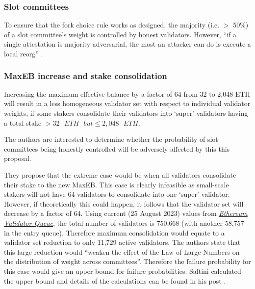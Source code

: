 \documentclass[UTF8]{article}
\begin{document}
\subsubsection*{Slot committees}
To ensure that the fork choice rule works as designed, the majority (i.e. $>$  50\%) of a slot committee's weight is controlled by honest validators. However, ``if a single attestation is majority adversarial, the most an attacker can do is execute a local reorg''  \cite{damato2023}.

\subsubsection*{MaxEB increase and stake consolidation}
Increasing the maximum effective balance by a factor of 64 from 32 to 2,048 ETH will result in a less homogeneous validator set with respect to individual validator weights, if some stakers consolidate their validators into `super' validators having a total stake $ > 32 \texttt{ } ETH \texttt{ } but \leqslant 2,048 \texttt{ }  ETH$.

The authors are interested to determine whether the probability of slot committees being honestly controlled will be adversely affected by this this proposal.

They propose that the extreme case would be when all validators consolidate their stake to the new MaxEB. This case is clearly infeasible as small-scale stakers will not have 64 validators to consolidate into one `super' validator. However, if theoretically this could happen, it follows that the validator set will decrease by a factor of 64. Using current (25 August 2023) values from \href{https://www.validatorqueue.com/}{\textit{Ethereum Validator Queue}}, the total number of validators is 750,668 (with another 58,757 in the entry queue). Therefore maximum consolidation would equate to a validator set reduction to only 11,729 active validators. The authors state that this large reduction would ``weaken the effect of the Law of Large Numbers on the distribution of weight across committees''. Therefore the failure probability for this case would give an upper bound for failure probabilities. Saltini calculated the upper bound and details of the calculations can be found in his post \cite{Saltini2023}.
\end{document}
